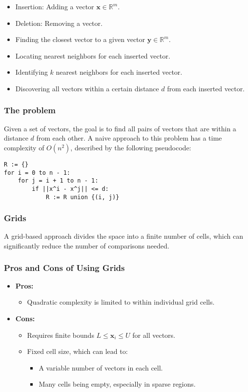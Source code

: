\documentclass[12pt]{article}
\begin{document}
\begin{itemize}
    \item Insertion: Adding a vector $\mathbf{x} \in \mathbb{R}^m$.
    \item Deletion: Removing a vector.
    \item Finding the closest vector to a given vector $\mathbf{y} \in \mathbb{R}^m$.
    \item Locating nearest neighbors for each inserted vector.
    \item Identifying $k$ nearest neighbors for each inserted vector.
    \item Discovering all vectors within a certain distance $d$ from each inserted vector.
\end{itemize}

\subsubsection{The problem}
Given a set of vectors, the goal is to find all pairs of vectors that are within a distance $d$ from each other. A naive approach to this problem has a time complexity of $O(n^2)$, described by the following pseudocode:

\begin{verbatim}
R := {}
for i = 0 to n - 1:
    for j = i + 1 to n - 1:
        if ||x^i - x^j|| <= d:
            R := R union {(i, j)}
\end{verbatim}


\subsubsection{Grids}
A grid-based approach divides the space into a finite number of cells, which can significantly reduce the number of comparisons needed.

\subsubsection{Pros and Cons of Using Grids}
\begin{itemize}
    \item \textbf{Pros:}
    \begin{itemize}
        \item Quadratic complexity is limited to within individual grid cells.
    \end{itemize}
    \item \textbf{Cons:}
    \begin{itemize}
        \item Requires finite bounds $L \leq \mathbf{x}_i \leq U$ for all vectors.
        \item Fixed cell size, which can lead to:
        \begin{itemize}
            \item A variable number of vectors in each cell.
            \item Many cells being empty, especially in sparse regions.
        \end{itemize}
    \end{itemize}
\end{itemize}
\end{document}
